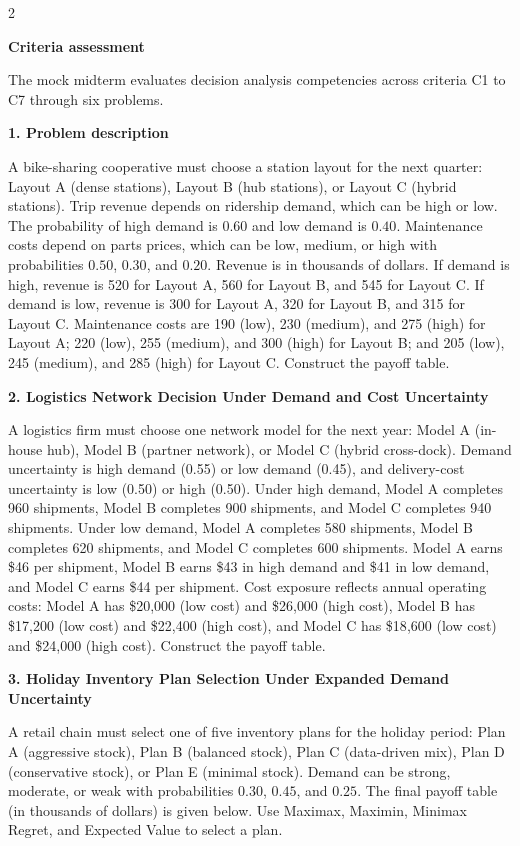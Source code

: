 \documentclass[12pt]{article}
\newcommand{\SubsectionBox}[1]{%
	\noindent\colorbox{gray!30}{%
		\parbox{\linewidth}{\textbf{#1}}%
	}\par\vspace{0.35cm}%
}
\begin{document}
	\begin{multicols}{2}
		
		\SubsectionBox{Criteria assessment}\vspace{-0.25cm}
		The mock midterm evaluates decision analysis competencies across criteria C1 to C7 through six problems.
		
		\vspace{0.25cm}
		\SubsectionBox{1. Problem description}\vspace{-0.25cm}
		A bike-sharing cooperative must choose a station layout for the next quarter: Layout A (dense stations),
		Layout B (hub stations), or Layout C (hybrid stations). Trip revenue depends on ridership demand,
		which can be high or low. The probability of high demand is $0.60$ and low demand is $0.40$.
		Maintenance costs depend on parts prices, which can be low, medium, or high with probabilities
		$0.50$, $0.30$, and $0.20$. Revenue is in thousands of dollars. If demand is high, revenue is 520 for Layout A,
		560 for Layout B, and 545 for Layout C. If demand is low, revenue is 300 for Layout A, 320 for Layout B,
		and 315 for Layout C. Maintenance costs are 190 (low), 230 (medium), and 275 (high) for Layout A;
		220 (low), 255 (medium), and 300 (high) for Layout B; and 205 (low), 245 (medium), and 285 (high) for Layout C.
		Construct the payoff table.
		
		\vspace{0.25cm}
		\SubsectionBox{2. Logistics Network Decision Under Demand and Cost Uncertainty}\vspace{-0.25cm}
		A logistics firm must choose one network model for the next year: Model A (in-house hub),
		Model B (partner network), or Model C (hybrid cross-dock). Demand uncertainty is high demand (0.55)
		or low demand (0.45), and delivery-cost uncertainty is low (0.50) or high (0.50).
		Under high demand, Model A completes 960 shipments, Model B completes 900 shipments, and Model C completes 940 shipments.
		Under low demand, Model A completes 580 shipments, Model B completes 620 shipments, and Model C completes 600 shipments.
		Model A earns \$46 per shipment, Model B earns \$43 in high demand and \$41 in low demand,
		and Model C earns \$44 per shipment. Cost exposure reflects annual operating costs:
		Model A has \$20{,}000 (low cost) and \$26{,}000 (high cost),
		Model B has \$17{,}200 (low cost) and \$22{,}400 (high cost), and
		Model C has \$18{,}600 (low cost) and \$24{,}000 (high cost).
		Construct the payoff table.
		
		\vspace{0.25cm}
		\SubsectionBox{3. Holiday Inventory Plan Selection Under Expanded Demand Uncertainty}\vspace{-0.25cm}
		A retail chain must select one of five inventory plans for the holiday period: Plan A (aggressive stock),
		Plan B (balanced stock), Plan C (data-driven mix), Plan D (conservative stock), or Plan E (minimal stock).
		Demand can be strong, moderate, or weak with probabilities $0.30$, $0.45$, and $0.25$.
		The final payoff table (in thousands of dollars) is given below. Use Maximax, Maximin, Minimax Regret,
		and Expected Value to select a plan.
		

\end{multicols}
\end{document}
